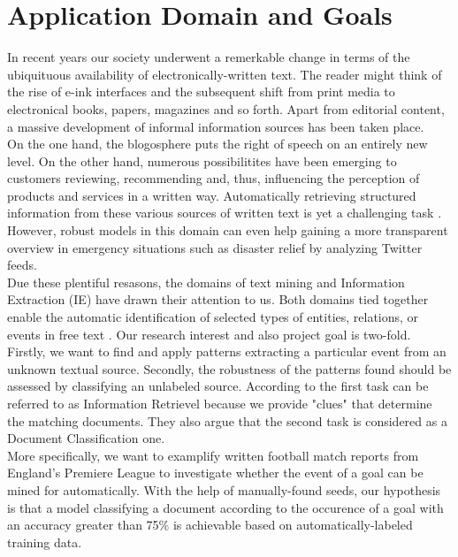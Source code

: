 \documentclass[11pt,titlepage,oneside,openany]{book}
\begin{document}
\section{Application Domain and Goals}
\label{sec:goals}
In recent years our society underwent a remerkable change in terms of the ubiquituous availability of electronically-written text. The reader might think of the rise of e-ink interfaces and the subsequent shift from print media to electronical books, papers, magazines and so forth. Apart from editorial content, a massive development of informal information sources has been taken place.\\ 
On the one hand, the blogosphere puts the right of speech on an entirely new level. On the other hand, numerous possibilitites have been emerging to customers reviewing, recommending and, thus, influencing the perception of products and services in a written way. Automatically retrieving structured information from these various sources of written text is yet a challenging task \citep[p.1]{Cellier2010}. However, robust models in this domain can even help gaining a more transparent overview in emergency situations such as disaster relief by analyzing Twitter feeds.\\

Due these plentiful resasons, the domains of text mining and Information Extraction (IE) have drawn their attention to us. Both domains tied together enable the automatic identification of selected types of entities, relations, or events in free text \citep[p.545]{Grishman2005}. Our research interest and also project goal is two-fold. Firstly, we want to find and apply patterns extracting a particular event from an unknown textual source. Secondly, the robustness of the patterns found should be assessed by classifying an unlabeled source. According to \citeauthor*{Weiss2005} \citeyearpar{Weiss2005} the first task can be referred to as Information Retrievel because we provide "clues" that determine the matching documents. They also argue that the second task is considered as a Document Classification one.\\

More specifically, we want to examplify written football match reports from England's Premiere League to investigate whether the event of a goal can be mined for automatically. With the help of manually-found seeds, our hypothesis is that a model classifying a document according to the occurence of a goal with an accuracy greater than 75\% is achievable based on automatically-labeled training data.\\
\end{document}
